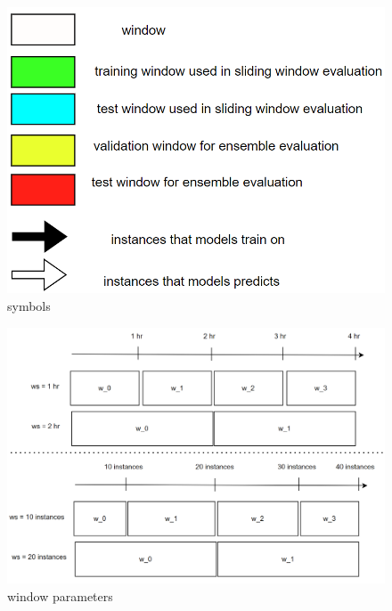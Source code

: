 \documentclass{IEEEtran}
\begin{document}
\begin{figure}[htbp]
\centering
\includegraphics[width=.9\linewidth]{./images/screenshot_20220321_130824.png}
\caption{\label{symbols}symbols}
\end{figure}

\begin{figure}[htbp]
\centering
\includegraphics[width=.9\linewidth]{./images/screenshot_20220321_110302.png}
\caption{\label{window_parameters}window parameters}
\end{figure}
\end{document}
